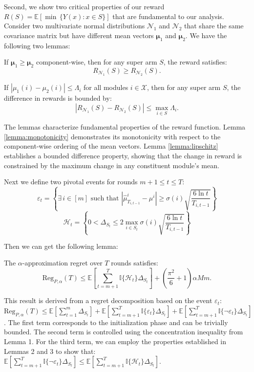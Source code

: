 \documentclass[opre,sglanonrev]{informs4}
\begin{document}
Second, we show two critical properties of our reward $R(S) = \mathbb{E}[\min\,\{Y(x) : x \in S\}]$ that are fundamental to our analysis. Consider two multivariate normal distributions $\mathcal{N}_1$ and $\mathcal{N}_2$ that share the same covariance matrix but have different mean vectors $\boldsymbol{\mu}_1$ and $\boldsymbol{\mu}_2$. We have the following two lemmas:

\begin{lemma}
\label{lemma:monotonicity}
If $\boldsymbol{\mu}_1 \geq \boldsymbol{\mu}_2$ component-wise, then for any super arm $S$, the reward satisfies:
$$
R_{\mathcal{N}_1}(S) \geq R_{\mathcal{N}_2}(S).
$$
\end{lemma}

\begin{lemma}
\label{lemma:lipschitz}
If $|\mu_1(i) - \mu_2(i)| \leq \Lambda_i$ for all modules $i \in \mathcal{X}$, then for any super arm $S$, the difference in rewards is bounded by:
$$
|R_{\mathcal{N}_1}(S) - R_{\mathcal{N}_2}(S)| \leq \max_{i \in S} \Lambda_i.
$$
\end{lemma}
The lemmas characterize fundamental properties of the reward function. Lemma \ref{lemma:monotonicity} demonstrates its monotonicity with respect to the component-wise ordering of the mean vectors. Lemma \ref{lemma:lipschitz} establishes a bounded difference property, showing that the change in reward is constrained by the maximum change in any constituent module's mean.

Next we define two pivotal events for rounds \(m+1 \leq t \leq T\):
$$
\varepsilon_t = \left\{\exists\, i \in [m] \text{ such that } \left|\hat{\mu}_{T_{i,t-1}}^i - \mu^i\right| \geq \sigma(i)\sqrt{\frac{6\ln t}{T_{i,t-1}}} \right\}
$$
$$
\mathcal{H}_t = \left\{0 < \Delta_{S_t} \leq 2 \max_{i \in S_t} \sigma(i)\sqrt{\frac{6\ln t}{T_{i,t-1}}} \right\}
$$

Then we can get the following lemma:

\begin{lemma}
\label{lemma:decomposition}
The \(\alpha\)-approximation regret over \(T\) rounds satisfies:
$$
\text{Reg}_{P,\alpha}(T) \leq \mathbb{E}\left[\sum_{t=m+1}^{T} \mathbb{I}\{\mathcal{H}_t\} \Delta_{S_t}\right] + \left(\frac{\pi^2}{6} + 1\right) \alpha M m.
$$
\end{lemma}

This result is derived from a regret decomposition based on the event \(\varepsilon_t\):
$
\text{Reg}_{P,\alpha}(T) \leq \mathbb{E}\left[\sum_{t=1}^{m} \Delta_{S_t}\right] + \mathbb{E}\left[\sum_{t=m+1}^{T} \mathbb{I}\{\varepsilon_t\} \Delta_{S_t}\right] + \mathbb{E}\left[\sum_{t=m+1}^{T} \mathbb{I}\{\neg \varepsilon_t\} \Delta_{S_t}\right]
$. The first term corresponds to the initialization phase and can be trivially bounded. The second term is controlled using the concentration inequality from Lemma 1. For the third term, we can employ the properties established in Lemmas 2 and 3 to show that:
$
\mathbb{E}\left[\sum_{t=m+1}^{T} \mathbb{I}\{\neg \varepsilon_t\} \Delta_{S_t}\right] \leq \mathbb{E}\left[\sum_{t=m+1}^{T} \mathbb{I}\{\mathcal{H}_t\} \Delta_{S_t}\right].
$ 
\end{document}
